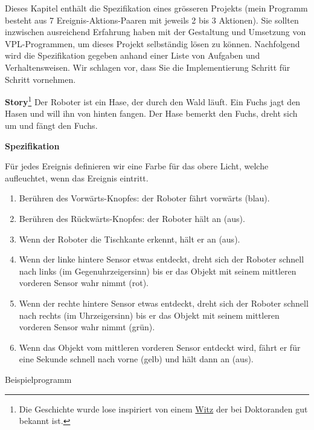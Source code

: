 \label{ch.rabbit}

Dieses Kapitel enthält die Spezifikation eines grösseren Projekts (mein Programm
besteht aus 7 Ereignis-Aktions-Paaren mit jeweils 2 bis 3 Aktionen). Sie sollten 
inzwischen ausreichend Erfahrung haben mit der Gestaltung und Umsetzung von VPL-Programmen, um dieses Projekt selbständig lösen zu können. Nachfolgend wird die Spezifikation gegeben anhand einer Liste von Aufgaben und Verhaltensweisen. Wir schlagen vor, dass Sie die Implementierung Schritt für Schritt vornehmen.

\textbf{Story}\footnote{Die Geschichte wurde lose inspiriert von einem 
\href{http://www.cs.hmc.edu/~fleck/parable.html}{Witz}
der bei Doktoranden gut bekannt ist.} Der Roboter ist ein Hase, der durch den Wald läuft. Ein Fuchs jagt den Hasen und will ihn von hinten fangen. Der Hase bemerkt den Fuchs, dreht sich um und fängt den Fuchs. 

\textbf{Spezifikation}

Für jedes Ereignis definieren wir eine Farbe für das obere Licht, welche aufleuchtet, wenn das Ereignis eintritt. 

\begin{enumerate}
\item Berühren des Vorwärts-Knopfes: der Roboter fährt vorwärts (blau).
\item Berühren des Rückwärts-Knopfes: der Roboter hält an (aus).
\item Wenn der Roboter die Tischkante erkennt, hält er an (aus).
\item Wenn der linke hintere Sensor etwas entdeckt, dreht sich der Roboter schnell nach links (im Gegenuhrzeigersinn) bis er das Objekt mit seinem mittleren vorderen Sensor wahr nimmt (rot).
\item Wenn der rechte hintere Sensor etwas entdeckt, dreht sich der Roboter schnell nach rechts (im Uhrzeigersinn) bis er das Objekt mit seinem mittleren vorderen Sensor wahr nimmt (grün).
\item Wenn das Objekt vom mittleren vorderen Sensor entdeckt wird, fährt er für eine Sekunde schnell nach vorne (gelb) und hält dann an (aus).
\end{enumerate}

{\raggedleft \hfill Beispielprogramm }
